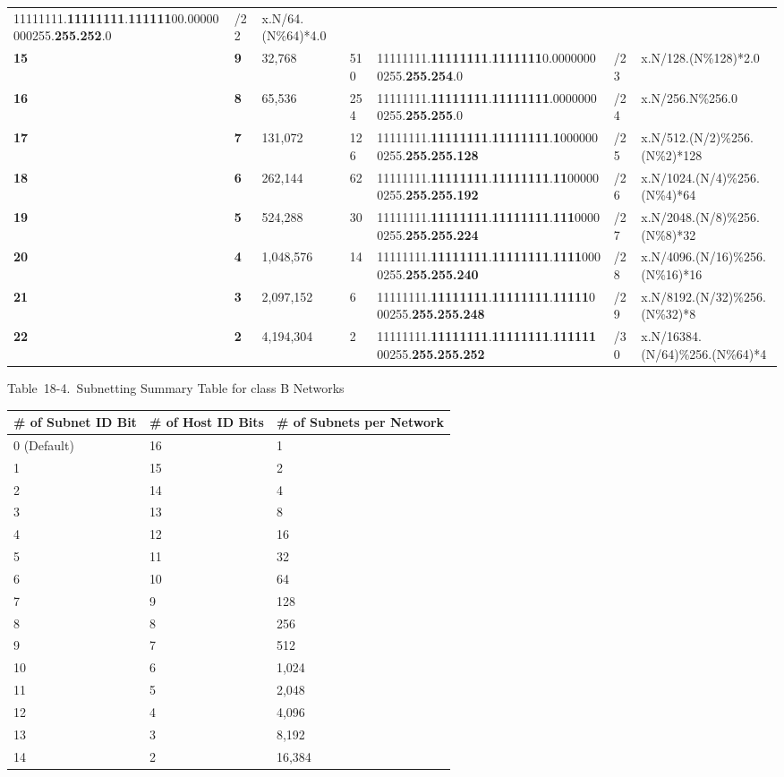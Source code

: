 \begin{longtable}[]{@{}lllllll@{}}
11111111.{\textbf{11111111}}.{\textbf{111111}}00.00000000255.{\textbf{255.252}}.0
& /22 & x.N/64.(N\%64)*4.0\tabularnewline
{\textbf{15}} & {\textbf{9}} & 32,768 & 510 &
11111111.{\textbf{11111111}}.{\textbf{1111111}}0.00000000255.{\textbf{255.254}}.0
& /23 & x.N/128.(N\%128)*2.0\tabularnewline
{\textbf{16}} & {\textbf{8}} & 65,536 & 254 &
11111111.{\textbf{11111111}}.{\textbf{11111111}}.00000000255.{\textbf{255.255}}.0
& /24 & x.N/256.N\%256.0\tabularnewline
{\textbf{17}} & {\textbf{7}} & 131,072 & 126 &
11111111.{\textbf{11111111}}.{\textbf{11111111}}.{\textbf{1}}0000000255.{\textbf{255.255.128}}
& /25 & x.N/512.(N/2)\%256.(N\%2)*128\tabularnewline
{\textbf{18}} & {\textbf{6}} & 262,144 & 62 &
11111111.{\textbf{11111111}}.{\textbf{11111111}}.{\textbf{11}}000000255.{\textbf{255.255.192}}
& /26 & x.N/1024.(N/4)\%256.(N\%4)*64\tabularnewline
{\textbf{19}} & {\textbf{5}} & 524,288 & 30 &
11111111.{\textbf{11111111}}.{\textbf{11111111}}.{\textbf{111}}00000255.{\textbf{255.255.224}}
& /27 & x.N/2048.(N/8)\%256.(N\%8)*32\tabularnewline
{\textbf{20}} & {\textbf{4}} & 1,048,576 & 14 &
11111111.{\textbf{11111111}}.{\textbf{11111111}}.{\textbf{1111}}0000255.{\textbf{255.255.240}}
& /28 & x.N/4096.(N/16)\%256.(N\%16)*16\tabularnewline
{\textbf{21}} & {\textbf{3}} & 2,097,152 & 6 &
11111111.{\textbf{11111111}}.{\textbf{11111111}}.{\textbf{11111}}000255.{\textbf{255.255.248}}
& /29 & x.N/8192.(N/32)\%256.(N\%32)*8\tabularnewline
{\textbf{22}} & {\textbf{2}} & 4,194,304 & 2 &
11111111.{\textbf{11111111}}.{\textbf{11111111}}.{\textbf{111111}}00255.{\textbf{255.255.252}}
& /30 & x.N/16384.(N/64)\%256.(N\%64)*4\tabularnewline
\bottomrule
\end{longtable}



Table~18-4.~Subnetting Summary Table for class B Networks

\begin{longtable}[]{@{}lll@{}}
\toprule
\# of Subnet ID Bit & \# of Host ID Bits & \# of Subnets per
Network\tabularnewline
\midrule
\endhead
0 (Default) & 16 & 1\tabularnewline
1 & 15 & 2\tabularnewline
2 & 14 & 4\tabularnewline
3 & 13 & 8\tabularnewline
4 & 12 & 16\tabularnewline
5 & 11 & 32\tabularnewline
6 & 10 & 64\tabularnewline
7 & 9 & 128\tabularnewline
8 & 8 & 256\tabularnewline
9 & 7 & 512\tabularnewline
10 & 6 & 1,024\tabularnewline
11 & 5 & 2,048\tabularnewline
12 & 4 & 4,096\tabularnewline
13 & 3 & 8,192\tabularnewline
14 & 2 & 16,384\tabularnewline
\bottomrule
\end{longtable}



